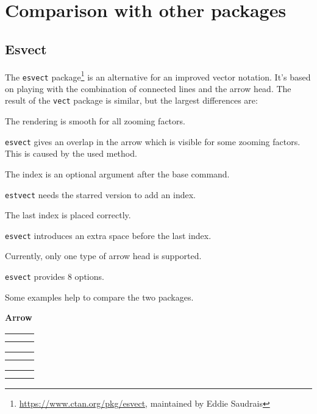 \documentclass[12pt]{article}
\makeatletter
\newenvironment{comparision}{%
\setlength{\extrarowheight}{\medskipamount}%
\begin{tabular}{@{}l @{\hspace{1em}} @{}l @{\hspace{1em}} @{}l}%
}{%
\end{tabular}%
}
\makeatother
\begin{document}
\section{Comparison with other packages}

\subsection{Esvect}

The \verb|esvect| package\footnote{\url{https://www.ctan.org/pkg/esvect}, maintained by Eddie Saudrais} is an alternative for an improved vector notation. It's based on playing with the combination of connected lines and the arrow head. The result of the \verb|vect| package is similar, but the largest differences are:\bigskip

\begin{bulItem}
\item The rendering is smooth for all zooming factors.\nopagebreak

\verb|esvect| gives an overlap in the arrow which is visible for some zooming factors. This is caused by the used method.\bigskip

\item The index is an optional argument after the base command.\nopagebreak

\verb|estvect| needs the starred version to add an index.\bigskip

\item The last index is placed correctly.\nopagebreak

\verb|esvect| introduces an extra space before the last index.\bigskip

\item Currently, only one type of arrow head is supported.\nopagebreak

\verb|esvect| provides 8 options.
\end{bulItem}\bigskip

Some examples help to compare the two packages.

\bigskip\textbf{Arrow}\bigskip

\begin{multicols}{2}
\begin{comparision}
\showcaseCmpA{$\vec{x}$} \\
\showcaseCmpB{$\vv{x}$} \\
\end{comparision}

\begin{comparision}
\showcaseCmpA{$\vec{AB}$} \\
\showcaseCmpB{$\vv{AB}$}
\end{comparision}

\begin{comparision}
\showcaseCmpA{$\vec{\imath}$} \\
\showcaseCmpB{$\vv{\imath}$}
\end{comparision}
\end{multicols}
\end{document}
